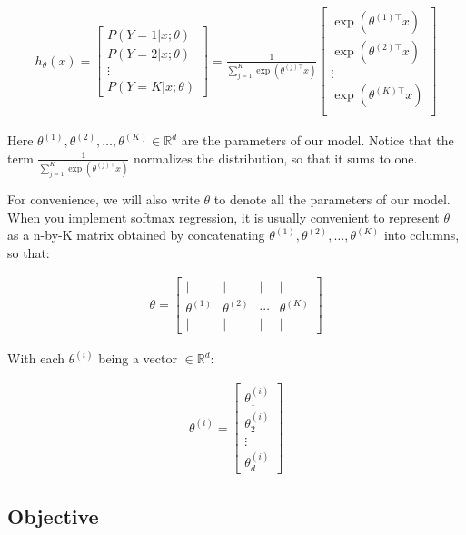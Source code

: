 \begin{align}
	h_\theta(x)
	=
	\begin{bmatrix}
		P(Y = 1 | x; \theta) \\ P(Y = 2 | x; \theta) \\ \vdots \\ P(Y = K | x; \theta) 
	\end{bmatrix} 
	= 
	\frac{1}{ \sum_{j=1}^{K}{\exp(\theta^{(j)\top} x) }} 
	\begin{bmatrix} 
		\exp(\theta^{(1)\top} x ) \\ \exp(\theta^{(2)\top} x ) \\ \vdots \\ \exp(\theta^{(K)\top} x ) \\ 
	\end{bmatrix} 
\end{align}

Here $\theta^{(1)}, \theta^{(2)}, \ldots, \theta^{(K)} \in \mathbb{R}^{d}$ are the parameters of our model. Notice that the term $\frac{1}{ \sum_{j=1}^{K}{\exp(\theta^{(j)\top} x) } }$ normalizes the distribution, so that it sums to one.

For convenience, we will also write $\theta$ to denote all the parameters of our model. When you implement softmax regression, it is usually convenient to represent $\theta$ as a n-by-K matrix obtained by concatenating $\theta^{(1)}, \theta^{(2)}, \ldots, \theta^{(K)}$ into columns, so that:

\begin{align}
	\theta = \left[\begin{array}{cccc}| & | & | & | \\ \theta^{(1)} & \theta^{(2)} & \cdots & \theta^{(K)} \\ | & | & | & | \end{array}\right]
\end{align}

With each $\theta^{(i)}$ being a vector $\in \mathbb{R}^{d}$:

\begin{align}
	\theta^{(i)} = \left[
		\begin{array}{cccc}
			\theta_{1}^{(i)} \\
			\theta_{2}^{(i)} \\
			\vdots \\
			\theta_{d}^{(i)}
		\end{array}\right]
\end{align}


\subsection{Objective}

